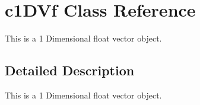 \hypertarget{classc1_d_vf}{
\section{c1DVf Class Reference}
\label{classc1_d_vf}
}


This is a 1 Dimensional float vector object.  




\subsection{Detailed Description}
This is a 1 Dimensional float vector object. 